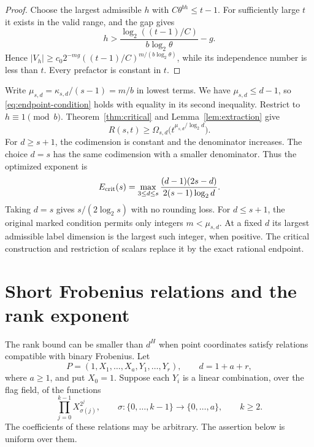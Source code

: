\documentclass[11pt,a4paper]{article}
\theoremstyle{definition}
\theoremstyle{remark}
\numberwithin{equation}{section}
\begin{document}
\begin{proof}
Choose the largest admissible $h$ with $C\theta^{bh}\le t-1$. For sufficiently large $t$ it exists in the valid range, and the gap gives
\[
h>\frac{\log_2((t-1)/C)}{b\log_2\theta}-g.
\]
Hence $|V_h|\ge c_0 2^{-mg}((t-1)/C)^{m/(b\log_2\theta)}$, while its independence number is less than $t$. Every prefactor is constant in $t$.
\end{proof}


Write $\mu_{s,d}=\kappa_{s,d}/(s-1)=m/b$ in lowest terms. We have $\mu_{s,d}\le d-1$, so \eqref{eq:endpoint-condition} holds with equality in its second inequality. Restrict to $h\equiv1\pmod b$. Theorem~\ref{thm:critical} and Lemma~\ref{lem:extraction} give
\begin{equation}\label{eq:critical-exponent}
R(s,t)\ge\Omega_{s,d}\bigl(t^{\mu_{s,d}/\log_2d}\bigr).
\end{equation}
For $d\ge s+1$, the codimension is constant and the denominator increases. The choice $d=s$ has the same codimension with a smaller denominator. Thus the optimized exponent is
\begin{equation}\label{eq:Ecrit}
E_{\rm crit}(s)=\max_{3\le d\le s}
\frac{(d-1)(2s-d)}{2(s-1)\log_2d}.
\end{equation}
Taking $d=s$ gives $s/(2\log_2s)$ with no rounding loss. For $d\le s+1$, the original marked condition permits only integers $m<\mu_{s,d}$. At a fixed $d$ its largest admissible label dimension is the largest such integer, when positive. The critical construction and restriction of scalars replace it by the exact rational endpoint.

\section{Short Frobenius relations and the rank exponent}\label{sec:words}
The rank bound can be smaller than $d^H$ when point coordinates satisfy relations compatible with binary Frobenius. Let
\[
P=(1,X_1,\ldots,X_a,Y_1,\ldots,Y_r),\qquad d=1+a+r,
\]
where $a\ge1$, and put $X_0=1$. Suppose each $Y_i$ is a linear combination, over the flag field, of the functions
\begin{equation}\label{eq:short-relation}
\prod_{j=0}^{k-1}X_{\sigma(j)}^{2^j},\qquad \sigma:\{0,\ldots,k-1\}\longrightarrow\{0,\ldots,a\},\qquad k\ge2.
\end{equation}
The coefficients of these relations may be arbitrary. The assertion below is uniform over them.
\end{document}
